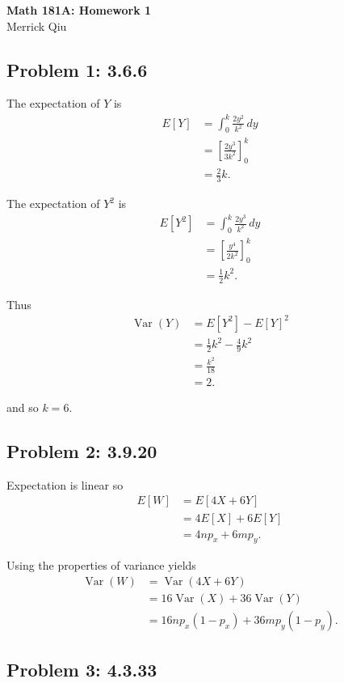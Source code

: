 \documentclass{article}
\newcommand{\var}{\operatorname{Var}}
\begin{document}
\begin{center}
	\huge{\bf Math 181A: Homework 1} \\
	Merrick Qiu 
\end{center}

\subsection*{Problem 1: 3.6.6}
The expectation of $Y$ is 
\begin{align*}
	E[Y] &= \int_0^k \frac{2y^2}{k^2} \,dy \\
	&= \left[\frac{2y^3}{3k^2}\right]_0^k \\
	&= \frac{2}{3}k.
\end{align*}

The expectation of $Y^2$ is 
\begin{align*}
	E[Y^2] &= \int_0^k \frac{2y^3}{k^2} \,dy \\
	&= \left[\frac{y^4}{2k^2}\right]_0^k \\
	&= \frac{1}{2}k^2.
\end{align*}

Thus 
\begin{align*}
	\var(Y) &= E[Y^2] - E[Y]^2 \\
	&= \frac{1}{2}k^2 - \frac{4}{9}k^2 \\
	&= \frac{k^2}{18} \\
	&= 2.
\end{align*}

and so $k = 6$.
\newpage



\subsection*{Problem 2: 3.9.20}
Expectation is linear so 
\begin{align*}
	E[W] &= E[4X+6Y] \\
	&= 4E[X] + 6E[Y] \\
	&= 4np_x + 6mp_y.
\end{align*}

Using the properties of variance yields
\begin{align*}
	\var(W) &= \var(4X+6Y) \\
	&= 16\var(X) + 36\var(Y) \\
	&= 16np_x(1-p_x) + 36mp_y(1-p_y).
\end{align*}
\newpage 

\subsection*{Problem 3: 4.3.33}
\end{document}
